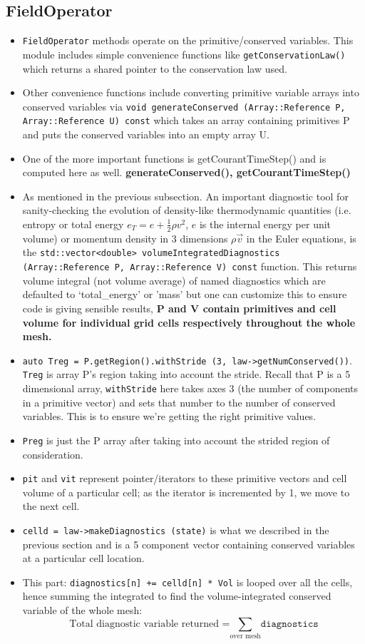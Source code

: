 \documentclass{article}
\begin{document}
\subsection{FieldOperator}
\begin{itemize}
	\item \texttt{FieldOperator} methods operate on the primitive/conserved variables. This module includes simple convenience functions like \texttt{getConservationLaw()} which returns a shared pointer to the conservation law used. 
	\item Other convenience functions include converting primitive variable arrays into conserved variables via \texttt{void generateConserved (Array::Reference P, Array::Reference U) const} which takes an array containing primitives P and puts the conserved variables into an empty array U. 
	\item One of the more important functions is getCourantTimeStep() and is computed here as well. \textbf{generateConserved(), getCourantTimeStep()}
	\item As mentioned in the previous subsection. An important diagnostic tool for sanity-checking the evolution of density-like thermodynamic quantities (i.e. entropy or total energy $e_T=e+\frac{1}{2}\rho v^2$, $e$ is the internal energy per unit volume) or momentum density in 3 dimensions $\rho \vec{v}$ in the Euler equations, is the \texttt{std::vector<double> volumeIntegratedDiagnostics (Array::Reference P, Array::Reference V) const} function. This returns volume integral (not volume average) of named diagnostics which are defaulted to `total\_energy' or 'mass' but one can customize this to ensure code is giving sensible results, \textbf{P and V contain primitives and cell volume for individual grid cells respectively throughout the whole mesh.} 
	\item \texttt{auto Treg = P.getRegion().withStride (3, law->getNumConserved())}. \texttt{Treg} is array P's region taking into account the stride. Recall that P is a 5 dimensional array, \texttt{withStride} here takes axes 3 (the number of components in a primitive vector) and sets that number to the number of conserved variables. This is to ensure we're getting the right primitive values.
	\item \texttt{Preg} is just the P array after taking into account the strided region of consideration.
	\item \texttt{pit} and \texttt{vit} represent pointer/iterators to these primitive vectors and cell volume of a particular cell; as the iterator is incremented by 1, we move to the next cell.
	\item  \texttt{celld = law->makeDiagnostics (state)} is what we described in the previous section and is a 5 component vector containing conserved variables at a particular cell location. 
	\item  This part: \texttt{diagnostics[n] += celld[n] * Vol} is looped over all the cells, hence summing the integrated to find the volume-integrated conserved variable of the whole mesh:
$$\text{Total diagnostic variable returned =} \sum_{\text{over mesh}} \texttt{diagnostics}$$
\end{itemize}
\end{document}

